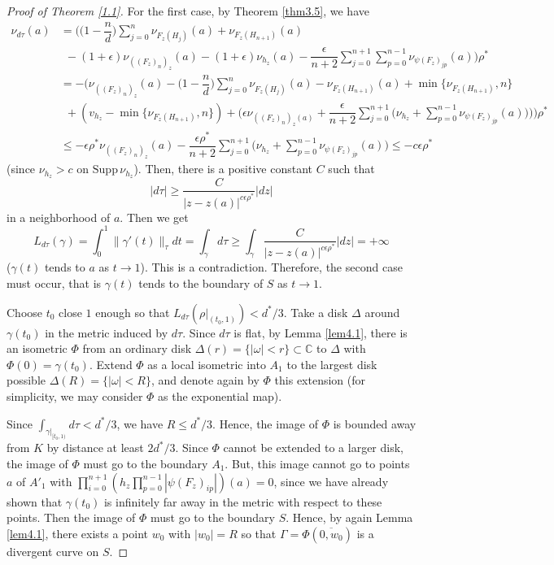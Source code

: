 \documentclass[12pt,article]{amsart}
\newcommand{\C}{{\mathbb{C}}}
\newcommand{\supp}{\mathrm{Supp}\,}
\numberwithin{equation}{section}
\begin{document}
\begin{proof}[Proof of Theorem \ref{1.1}]
For the first case, by Theorem \ref{thm3.5}, we have
\begin{align*}
\nu_{d\tau}(a)&=\biggl(\big(1-\dfrac{n}{d}\big)\sum_{j=0}^n\nu_{F_z(H_j)}(a)+\nu_{F_z(H_{n+1})}(a)\\
&\  \ -(1+\epsilon)\nu_{((F_z)_{n})_z}(a)-(1+\epsilon)\nu_{h_z}(a)-\dfrac{\epsilon}{n+2}\sum_{j=0}^{n+1}\sum_{p=0}^{n-1}\nu_{\psi(F_z)_{jp}}(a)\biggl)\rho^*\\
&= -\biggl (\nu_{((F_z)_{n})_z}(a)-\big(1-\dfrac{n}{d}\big)\sum_{j=0}^{n}\nu_{F_z(H_j)}(a)-\nu_{F_z(H_{n+1})}(a)+\min\{\nu_{F_z(H_{n+1})},n\}\\ 
&\  \ + (v_{h_z}-\min\{\nu_{F_z(H_{n+1})},n\} )+\bigl(\epsilon\nu_{((F_z)_{n})_z(a)}+\dfrac{\epsilon}{n+2}\sum_{j=0}^{n+1}\big(\nu_{h_{z}}+\sum_{p=0}^{n-1}\nu_{\psi(F_z)_{jp}}(a)\big)\bigl)\biggl)\rho^*\\
&\le -\epsilon\rho^*\nu_{((F_z)_{n})_z}(a)-\dfrac{\epsilon\rho^*}{n+2}\sum_{j=0}^{n+1}\big(\nu_{h_{z}}+\sum_{p=0}^{n-1}\nu_{\psi(F_z)_{jp}}(a)\big)\le -c\epsilon\rho^*
\end{align*}
(since $\nu_{h_{z}}>c$ on $\supp\nu_{h_z}$). Then, there is a positive constant $C$ such that
$$ |d\tau|\ge\dfrac{C}{|z-z(a)|^{c\epsilon\rho^*}}|dz|$$
in a neighborhood of $a$. Then we get
$$ L_{d\tau}(\gamma)=\int_0^1\|\gamma'(t)\|_{\tau}dt=\int_{\gamma}d\tau \ge\int_\gamma \dfrac{C}{|z-z(a)|^{c\epsilon\rho^*}}|dz|=+\infty$$
($\gamma (t)$ tends to $a$ as $t\rightarrow 1$). This is a contradiction. Therefore, the second case must occur, that is $\gamma (t)$ tends to the boundary of $S$ as $t\rightarrow 1$.  

Choose $t_0$ close $1$ enough so that $L_{d\tau}(\rho|_{(t_0,1)})<d^*/3$. Take a disk $\Delta$ around $\gamma(t_0)$ in the metric induced by $d\tau$. Since $d\tau$ is flat, by Lemma \ref{lem4.1}, there is an isometric $\Phi$ from an ordinary disk $\Delta(r)=\{|\omega|<r\}\subset\C$ to $\Delta$  with $\Phi(0)=\gamma(t_0)$. Extend $\Phi$ as a local isometric into $A_1$ to the largest disk possible $\Delta(R)=\{|\omega|<R\}$, and denote again by $\Phi$ this extension (for simplicity, we may consider $\Phi$ as the exponential map).  

Since $\int_{\gamma|_{[t_0,1)}}d\tau<d^*/3$, we have $R\le d^*/3$. Hence, the image of $\Phi$ is bounded away from $K$ by distance at least $2d^*/3$. Since $\Phi$ cannot be extended to a larger disk, the image of $\Phi$ must go to the boundary $A_1$. But, this image cannot go to points $a$ of $A'_1$ with $ \prod_{i=0}^{n+1}(h_z\prod_{p=0}^{n-1}|\psi(F_z)_{ip}|)(a)=0$, since we have already shown that $\gamma(t_0)$ is infinitely far away in the metric with respect to these points. Then the image of $\Phi$ must go to the boundary $S$. Hence, by again Lemma \ref{lem4.1}, there exists a point $w_0$ with $|w_0|= R$ so that $\Gamma=\Phi(\overline{0,w_0})$ is a divergent curve on $S$.


\end{proof}
\end{document}

